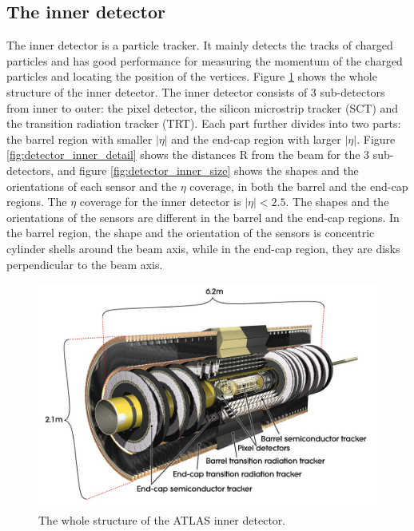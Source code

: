 \subsection{The inner detector}
The inner detector is a particle tracker.
It mainly detects the tracks of charged particles and has good performance for measuring the momentum of the charged particles and locating the position of the vertices.
Figure \ref{fig:detector_inner_whole} shows the whole structure of the inner detector.
The inner detector consists of 3 sub-detectors from inner to outer: the pixel detector, the silicon microstrip tracker (SCT) and the transition radiation tracker (TRT).
Each part further divides into two parts: the barrel region with smaller $|\eta|$ and the end-cap region with larger $|\eta|$.
Figure \ref{fig:detector_inner_detail} shows the distances R from the beam for the 3 sub-detectors, and figure \ref{fig:detector_inner_size} shows the shapes and the orientations of each sensor and the $\eta$ coverage, in both the barrel and the end-cap regions.
The $\eta$ coverage for the inner detector is $|\eta| < 2.5$.
The shapes and the orientations of the sensors are different in the barrel and the end-cap regions.
In the barrel region, the shape and the orientation of the sensors is concentric cylinder shells around the beam axis, while in the end-cap region, they are disks perpendicular to the beam axis.
\begin{figure}
\centering
\includegraphics[width=\textwidth]{data/photo/inner_whole.jpg}
\caption{The whole structure of the ATLAS inner detector. \cite{inner_photo}}
\label{fig:detector_inner_whole}
\end{figure}
